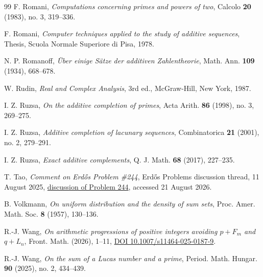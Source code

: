 \documentclass[11pt,reqno]{amsart}
\numberwithin{equation}{section}
\begin{document}
\begin{thebibliography}{99}
    F. Romani, \emph{Computations concerning primes and powers of two}, Calcolo \textbf{20} (1983), no. 3, 319--336.

    F. Romani, \emph{Computer techniques applied to the study of additive sequences}, Thesis, Scuola Normale Superiore di Pisa, 1978.

    N. P. Romanoff, \emph{\"Uber einige S\"atze der additiven Zahlentheorie}, Math. Ann. \textbf{109} (1934), 668--678.

    W. Rudin, \emph{Real and Complex Analysis}, 3rd ed., McGraw-Hill, New York, 1987.

    I. Z. Ruzsa, \emph{On the additive completion of primes}, Acta Arith. \textbf{86} (1998), no. 3, 269--275.

    I. Z. Ruzsa, \emph{Additive completion of lacunary sequences}, Combinatorica \textbf{21} (2001), no. 2, 279--291.

    I. Z. Ruzsa, \emph{Exact additive complements}, Q. J. Math. \textbf{68} (2017), 227--235.

    T. Tao, \emph{Comment on Erd\H{o}s Problem \#244}, Erd\H{o}s Problems discussion thread, 11 August 2025, \href{https://www.erdosproblems.com/forum/thread/244}{discussion of Problem 244}, accessed 21 August 2026.

    B. Volkmann, \emph{On uniform distribution and the density of sum sets}, Proc. Amer. Math. Soc. \textbf{8} (1957), 130--136.

    R.-J. Wang, \emph{On arithmetic progressions of positive integers avoiding $p+F_m$ and $q+L_n$}, Front. Math. (2026), 1--11, \href{https://doi.org/10.1007/s11464-025-0187-9}{DOI 10.1007/s11464-025-0187-9}.

    R.-J. Wang, \emph{On the sum of a Lucas number and a prime}, Period. Math. Hungar. \textbf{90} (2025), no. 2, 434--439.

    \end{thebibliography}
\end{document}
